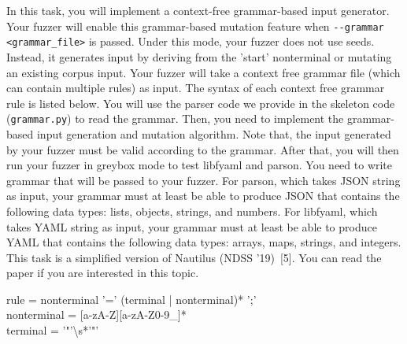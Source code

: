 \documentclass[letterpaper,11pt]{article}
\begin{document}
In this task, you will implement a context-free grammar-based input generator.
Your fuzzer will enable this grammar-based mutation feature when \texttt{{-}{-}grammar <grammar_file>} is passed.
Under this mode, your fuzzer does not use seeds.
Instead, it generates input by deriving from the 'start' nonterminal or mutating an existing corpus input.
Your fuzzer will take a context free grammar file (which can contain multiple rules) as input.
The syntax of each context free grammar rule is listed below.
You will use the parser code we provide in the skeleton code (\texttt{grammar.py}) to read the grammar.
Then, you need to implement the grammar-based input generation and mutation algorithm.
Note that, the input generated by your fuzzer must be valid according to the grammar.
After that, you will then run your fuzzer in greybox mode to test libfyaml and parson.
You need to write grammar that will be passed to your fuzzer.
For parson, which takes JSON string as input, your grammar must at least be able to produce JSON that contains the following data types: lists, objects, strings, and numbers.
For libfyaml, which takes YAML string as input, your grammar must at least be able to produce YAML that contains the following data types: arrays, maps, strings, and integers.
This task is a simplified version of Nautilus (NDSS '19)~[5].
You can read the paper if you are interested in this topic.





\begin{code}
    rule        = nonterminal '='  (terminal | nonterminal)* ';' \\
    nonterminal          = [a-zA-Z][a-zA-Z0-9_]* \\
    terminal           = '"'\textbackslash s*'"'
\end{code}

\end{document}
